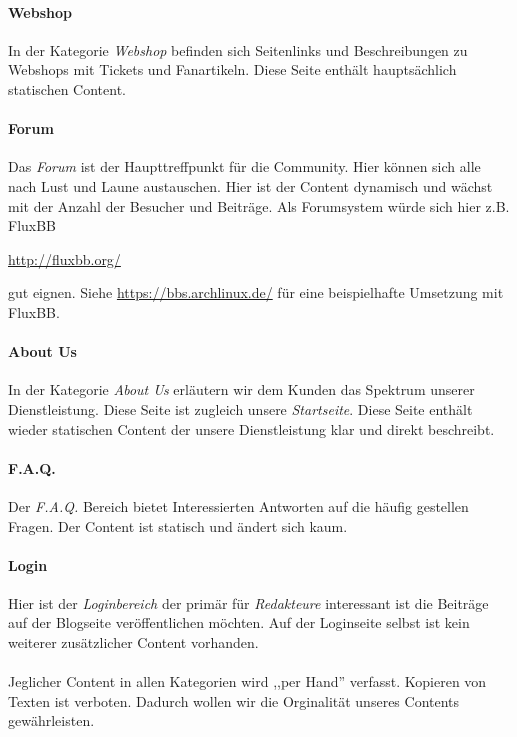 \paragraph{Webshop}
In der Kategorie \emph{Webshop} befinden sich Seitenlinks und Beschreibungen zu
Webshops mit Tickets und Fanartikeln. Diese Seite enthält hauptsächlich
statischen Content.

\paragraph{Forum}
Das \emph{Forum} ist der Haupttreffpunkt für die Community. Hier können sich
alle nach Lust und Laune austauschen. Hier ist der Content dynamisch und wächst
mit der Anzahl der Besucher und Beiträge. Als Forumsystem würde sich hier
z.B. FluxBB 
\begin{center}
    \url{http://fluxbb.org/}
\end{center}
gut eignen. Siehe \url{https://bbs.archlinux.de/} für eine beispielhafte
Umsetzung mit FluxBB.

\paragraph{About Us}
In der Kategorie \emph{About Us} erläutern wir dem Kunden das Spektrum unserer
Dienstleistung. Diese Seite ist zugleich unsere \emph{Startseite}. Diese Seite
enthält wieder statischen Content der unsere Dienstleistung klar und direkt
beschreibt.

\paragraph{F.A.Q.}
Der \emph{F.A.Q.} Bereich bietet Interessierten Antworten auf die häufig
gestellen Fragen. Der Content ist statisch und ändert sich kaum. 

\paragraph{Login}
Hier ist der \emph{Loginbereich} der primär für \emph{Redakteure} interessant
ist die Beiträge auf der Blogseite veröffentlichen möchten. Auf der Loginseite
selbst ist kein weiterer zusätzlicher Content vorhanden.
\\
\\
Jeglicher Content in allen Kategorien wird ,,per Hand'' verfasst. Kopieren von
Texten ist verboten. Dadurch wollen wir die Orginalität unseres Contents
gewährleisten.

